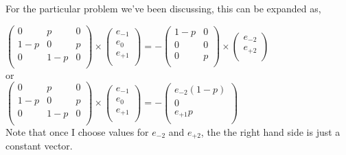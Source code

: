 \documentclass{article}
\begin{document}
For the particular problem we've been discussing, this can be expanded as,

$
\left(
\begin{array}{ccc}
 0 & p & 0 \\
 1-p & 0 & p \\
 0 & 1-p & 0 \\
\end{array}
\right) \times
\left(
\begin{array}{c}
 e_{-1} \\
 e_{0} \\
 e_{+1} \\
\end{array}
\right) = 
- \left(
\begin{array}{cc}
 1-p & 0 \\
 0 & 0 \\
 0 & p \\
\end{array}
\right) \times 
\left(
\begin{array}{c}
 e_{-2} \\
 e_{+2} \\
\end{array}
\right)
$ \\

or \\

$
\left(
\begin{array}{ccc}
 0 & p & 0 \\
 1-p & 0 & p \\
 0 & 1-p & 0 \\
\end{array}
\right) \times
\left(
\begin{array}{c}
 e_{-1} \\
 e_{0} \\
 e_{+1} \\
\end{array}
\right) = 
-\left(
\begin{array}{c}
 e_{-2} (1-p) \\
 0 \\
 e_{+1} p \\
\end{array}
\right)
$ \\

Note that once I choose values for $e_{-2}$ and $e_{+2}$, the the right hand side is just a constant vector. \\
\end{document}
